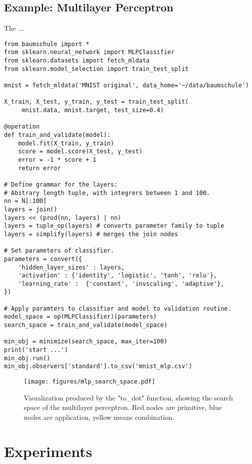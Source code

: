 \documentclass[english]{article}
\begin{document}
\subsection{Example: Multilayer Perceptron}
The ...


\begin{verbatim}
from baumschule import *
from sklearn.neural_network import MLPClassifier
from sklearn.datasets import fetch_mldata
from sklearn.model_selection import train_test_split

mnist = fetch_mldata('MNIST original', data_home='~/data/baumschule')

X_train, X_test, y_train, y_test = train_test_split(
     mnist.data, mnist.target, test_size=0.4)

@operation
def train_and_validate(model):
    model.fit(X_train, y_train)
    score = model.score(X_test, y_test)
    error = -1 * score + 1
    return error

# Define grammar for the layers:
# Abitrary length tuple, with integrers between 1 and 100.
nn = N[:100]
layers = join()
layers << (prod(nn, layers) | nn)
layers = tuple_op(layers) # converts parameter family to tuple
layers = simplify(layers) # merges the join nodes

# Set parameters of classifier.
parameters = convert({
    'hidden_layer_sizes' : layers,
    'activation' : {'identity', 'logistic', 'tanh', 'relu'},
    'learning_rate' :  {'constant', 'invscaling', 'adaptive'},
})

# Apply paramters to classifier and model to validation routine.
model_space = op(MLPClassifier)(parameters)
search_space = train_and_validate(model_space)

min_obj = minimize(search_space, max_iter=100)
print('start ...')
min_obj.run()
min_obj.observers['standard'].to_csv('mnist_mlp.csv')

\end{verbatim}

\begin{figure}
  \texttt{[image: figures/mlp\_search\_space.pdf]}
  \caption{Visualization produced by the "to\_dot" function, showing the search space of the multilayer perceptron. Red nodes are primitive, blue nodes are application, yellow means combination.}
  \label{mlp_search_space}
\end{figure}


\section{Experiments}
\end{document}
